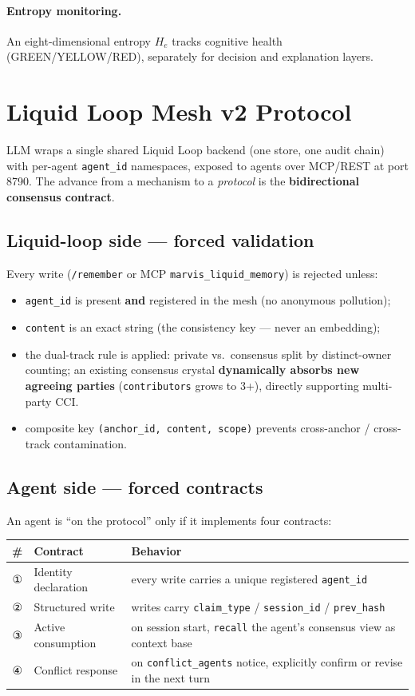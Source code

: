 \documentclass[UTF8]{ctexart}
\begin{document}
\paragraph{Entropy monitoring.} An eight-dimensional entropy $H_e$ tracks cognitive
health (GREEN/YELLOW/RED), separately for decision and explanation layers.

\section{Liquid Loop Mesh v2 Protocol}
LLM wraps a single shared Liquid Loop backend (one store, one audit chain)
with per-agent \texttt{agent\_id} namespaces, exposed to agents over MCP/REST at port
8790. The advance from a mechanism to a \emph{protocol} is the \textbf{bidirectional
consensus contract}.

\subsection{Liquid-loop side --- forced validation}
Every write (\texttt{/remember} or MCP \texttt{marvis\_liquid\_memory}) is rejected unless:
\begin{itemize}
  \item \texttt{agent\_id} is present \textbf{and} registered in the mesh (no anonymous pollution);
  \item \texttt{content} is an exact string (the consistency key --- never an embedding);
  \item the dual-track rule is applied: private vs.\ consensus split by distinct-owner
  counting; an existing consensus crystal \textbf{dynamically absorbs new agreeing
  parties} (\texttt{contributors} grows to 3+), directly supporting multi-party CCI.
  \item composite key \texttt{(anchor\_id, content, scope)} prevents cross-anchor / cross-track
  contamination.
\end{itemize}

\subsection{Agent side --- forced contracts}
An agent is ``on the protocol'' only if it implements four contracts:

\begin{tabular}{c p{3cm} p{8cm}}
\toprule
\# & Contract & Behavior \\
\midrule
① & Identity declaration & every write carries a unique registered \texttt{agent\_id} \\
② & Structured write & writes carry \texttt{claim\_type} / \texttt{session\_id} / \texttt{prev\_hash} \\
③ & Active consumption & on session start, \texttt{recall} the agent's consensus view as context base \\
④ & Conflict response & on \texttt{conflict\_agents} notice, explicitly confirm or revise in the next turn \\
\bottomrule
\end{tabular}
\end{document}
